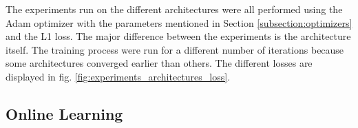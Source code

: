 The experiments run on the different architectures were all performed using the Adam optimizer with the parameters mentioned in Section \ref{subsection:optimizers} and the L1 loss. The major difference between the experiments is the architecture itself. The training process were run for a different number of iterations because some architectures converged earlier than others. The different losses are displayed in fig. \ref{fig:experiments_architectures_loss}.

\subsection{Online Learning} \label{subsection:experiments_online_learning}

      			
